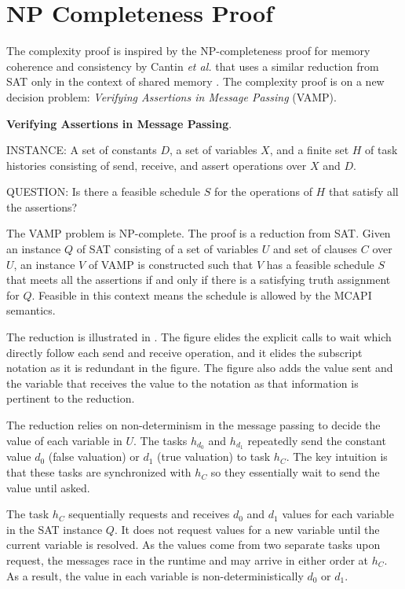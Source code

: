 \section{NP Completeness Proof} 
The complexity proof is inspired by the NP-completeness proof for
memory coherence and consistency by Cantin \emph{et al.} that uses a
similar reduction from SAT only in the context of shared memory
\cite{Cantin:2005:CVM:1070608.1070722}. The complexity proof is on a
new decision problem: \emph{Verifying Assertions in Message Passing}
(VAMP).
\begin{definition}
\textbf{Verifying Assertions in Message Passing}.
\begin{compactdesc}
\item{INSTANCE}: A set of constants $D$, a set of variables $X$, and a
  finite set $H$ of task histories consisting of send, receive, and
  assert operations over $X$ and $D$.
\item{QUESTION}: Is there a feasible schedule $S$ for the operations
  of $H$ that satisfy all the assertions?
\end{compactdesc}
\label{def:np1}
\end{definition}

The VAMP problem is NP-complete. The proof is a reduction from
SAT. Given an instance $Q$ of SAT consisting of a set of variables $U$
and set of clauses $C$ over $U$, an instance $V$ of VAMP is
constructed such that $V$ has a feasible schedule $S$ that meets all
the assertions if and only if there is a satisfying truth assignment
for $Q$. Feasible in this context means the schedule is allowed by the
MCAPI semantics.

The reduction is illustrated in . The figure elides
the explicit calls to wait which directly follow each send and receive
operation, and it elides the subscript notation as it is redundant in
the figure. The figure also adds the value sent and the variable that
receives the value to the notation as that information is pertinent to
the reduction.

The reduction relies on non-determinism in the message passing to
decide the value of each variable in $U$.  The tasks $h_{d_0}$ and
$h_{d_1}$ repeatedly send the constant value $d_0$ (false valuation) or
$d_1$ (true valuation) to task $h_C$. The key intuition is that these
tasks are synchronized with $h_C$ so they essentially wait to send the
value until asked.

The task $h_C$ sequentially requests and receives $d_0$ and $d_1$
values for each variable in the SAT instance $Q$. It does not request
values for a new variable until the current variable is resolved. As
the values come from two separate tasks upon request, the messages
race in the runtime and may arrive in either order at $h_C$. As a
result, the value in each variable is non-deterministically $d_0$ or $d_1$.

